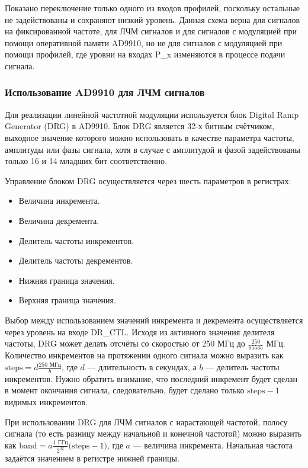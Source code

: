 \documentclass[rusmathsym, eqnumwithinsec, amspack, hyperref]{bomgost}
\begin{document}
Показано переключение только одного из входов профилей, поскольку остальные не задействованы и сохраняют низкий уровень. Данная схема верна для сигналов на фиксированной частоте, для ЛЧМ сигналов и для сигналов с модуляцией при помощи оперативной памяти AD9910, но не для сигналов с модуляцией при помощи профилей, где уровни на входах P\_x изменяются в процессе подачи сигнала.

\subsubsection{Использование AD9910 для ЛЧМ сигналов}

Для реализации линейной частотной модуляции используется блок \textenglish{Digital Ramp Generator} (DRG) в AD9910. Блок DRG является 32-х битным счётчиком, выходное значение которого можно использовать в качестве параметра частоты, амплитуды или фазы сигнала, хотя в случае с амплитудой и фазой задействованы только 16 и 14 младших бит соответственно.

Управление блоком DRG осуществляется через шесть параметров в регистрах:

\begin{itemize}
	\item Величина инкремента.
	\item Величина декремента.
	\item Делитель частоты инкрементов.
	\item Делитель частоты декрементов.
	\item Нижняя граница значения.
	\item Верхняя граница значения.
\end{itemize}

Выбор между использованием значений инкремента и декремента осуществляется через уровень на входе DR\_CTL. Исходя из активного значения делителя частоты, DRG может делать отсчёты со скоростью от 250 МГц до $\frac{250}{65535}$ МГц. Количество инкрементов на протяжении одного сигнала можно выразить как $\text{steps} = d\frac{250 \text{ МГц}}{b}$, где $d$ --- длительность в секундах, а $b$ --- делитель частоты инкрементов. Нужно обратить внимание, что последний инкремент будет сделан в момент окончания сигнала, следовательно, будет сделано только $\text{steps}-1$ видимых инкрементов.

При использовании DRG для ЛЧМ сигналов с нарастающей частотой, полосу сигнала (то есть разницу между начальной и конечной частотой) можно выразить как $\text{band} = a\frac{1 \text{ ГГц}}{2^{32}} \bigl( \text{steps} - 1\bigr)$, где $a$ --- величина инкремента. Начальная частота задаётся значением в регистре нижней границы.
\end{document}
